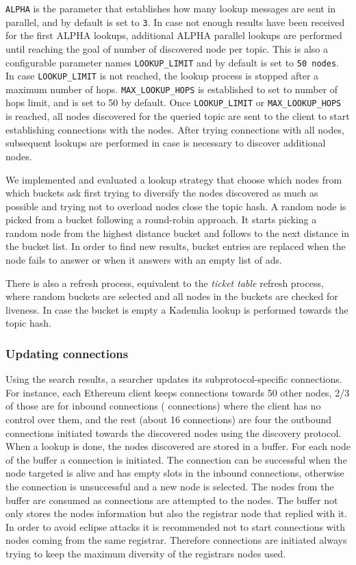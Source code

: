 \texttt{ALPHA} is the parameter that establishes how many lookup messages are sent in parallel, and by default is set to \texttt{3}.
In case not enough results have been received for the first ALPHA lookups,  additional ALPHA parallel lookups are performed until
reaching the goal of number of discovered node per topic.
This is also a configurable parameter names \texttt{LOOKUP\_LIMIT} and by default is set to \texttt{50 nodes}. 
In case  \texttt{LOOKUP\_LIMIT}  is not reached, the lookup process is stopped after a maximum number of hops. 
\texttt{MAX\_LOOKUP\_HOPS} is established to set to number of hops limit, and is set to 50 by default.
Once  \texttt{LOOKUP\_LIMIT} or \texttt{MAX\_LOOKUP\_HOPS} is reached,  all nodes discovered for the queried topic are sent to the client to start establishing connections with the nodes.
After trying connections with all nodes,  subsequent lookups are performed in case is necessary to discover additional nodes.

We implemented and evaluated a lookup strategy that choose which nodes from which buckets ask first trying to diversify the nodes discovered as much as possible and trying not to overload nodes close the topic hash.
A random node is picked from a bucket following a round-robin approach. 
It starts picking a random node from the highest distance bucket and follows to the next distance in the bucket list.
In order to find new results,  bucket entries are replaced when the node fails to answer or when it answers with an empty list of ads. 

There is also a refresh process,  equivalent to the \emph{ticket table} refresh process, where random buckets are selected and all nodes in the buckets are checked for liveness.
In case the bucket is empty a Kademlia lookup is performed towards the topic hash.

\subsubsection{Updating connections}

Using the search results, a searcher updates its subprotocol-specific connections. 
For instance,  each Ethereum client keeps connections towards 50 other nodes,  2/3 of those are for inbound connections ( connections) where the client has no control over them, and the rest (about 16 connections) are four the outbound connections initiated towards the discovered nodes using the discovery protocol. 
When a lookup is done,  the nodes discovered are stored in a buffer. 
For each node of the buffer a connection is initiated. 
The connection can be successful when the node targeted is alive and has empty slots in the inbound connections,  otherwise the connection is unsuccessful and a new node is selected.
The nodes from the buffer are consumed as connections are attempted to the nodes.
The buffer not only stores the nodes information but also the registrar node that replied with it.
In order to avoid eclipse attacks it is recommended not to start connections with nodes coming from the same registrar. 
Therefore connections are initiated always trying to keep the maximum diversity of the  registrars nodes used.

